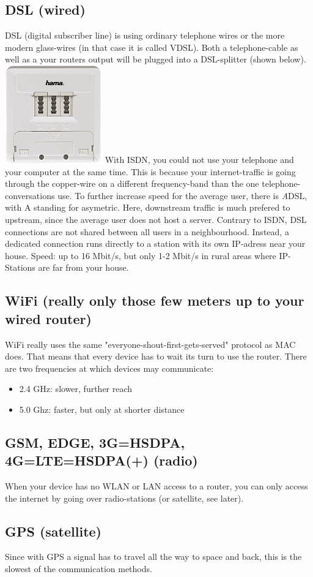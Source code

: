 \subsection{DSL (wired)}
DSL (digital subscriber line) is using ordinary telephone wires or the more modern glass-wires (in that case it is called VDSL). Both a telephone-cable as well as a your routers output will be plugged into a DSL-splitter (shown below).
\includegraphics{images/dsl_splitter.png}
With ISDN, you could not use your telephone and your computer at the same time. This is because your internet-traffic is going through the copper-wire on a different frequency-band than the one telephone-conversations use.  
To further increase speed for the average user, there is \emph{A}DSL, with A standing for asymetric. Here, downstream traffic is much prefered to upstream, since the average user does not host a server.
Contrary to ISDN, DSL connections are not shared between all users in a neighbourhood. Instead, a dedicated connection runs directly to a station with its own IP-adress near your house. 
Speed: up to 16 Mbit/s, but only 1-2 Mbit/s in rural areas where IP-Stations are far from your house.


\subsection{WiFi (really only those few meters up to your wired router)}
WiFi really uses the same "everyone-shout-first-gets-served" protocol as MAC does. That means that every device has to wait its turn to use the router. 
There are two frequencies at which devices may communicate:
\begin{itemize}
    \item 2.4 GHz: slower, further reach
    \item 5.0 Ghz: faster, but only at shorter distance
\end{itemize}


\subsection{GSM, EDGE, 3G=HSDPA, 4G=LTE=HSDPA(+) (radio)}
When your device has no WLAN or LAN access to a router, you can only access the internet by going over radio-stations (or satellite, see later). 


\subsection{GPS (satellite)}
Since with GPS a signal has to travel all the way to space and back, this is the slowest of the communication methods. 